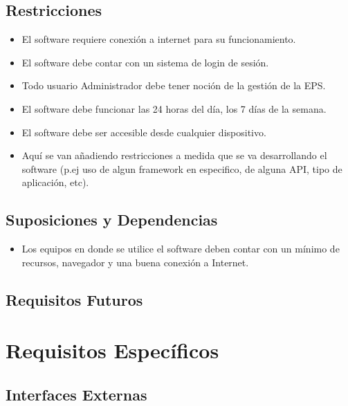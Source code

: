 \documentclass[12pt,a4paper]{article}
\begin{document}
\subsection{Restricciones}
\begin{itemize}
\item El software requiere conexión a internet para su funcionamiento.
\item El software debe contar con un sistema de login de sesión.
\item Todo usuario Administrador debe tener noción de la gestión de la EPS.
\item El software debe funcionar las 24 horas del día, los 7 días de la semana.
\item El software debe ser accesible desde cualquier dispositivo.
\item Aquí se van añadiendo restricciones a medida que se va desarrollando el software (p.ej uso de algun framework en especifico, de alguna API, tipo de aplicación, etc).
\end{itemize}
\subsection{Suposiciones y Dependencias}
\begin{itemize}
\item Los equipos en donde se utilice el software deben contar con un mínimo de recursos, navegador y una buena conexión a Internet.
\end{itemize}
\subsection{Requisitos Futuros}
\section{Requisitos Específicos}
\subsection{Interfaces Externas}
\end{document}
